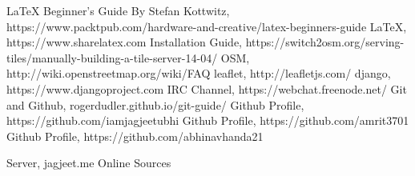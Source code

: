 
\begin{thebibliography}{9}
\bibitem{} \LaTeX{} Beginner's Guide By Stefan Kottwitz, https://www.packtpub.com/hardware-and-creative/latex-beginners-guide 
\bibitem{} \LaTeX{}, https://www.sharelatex.com
\bibitem{} Installation Guide, https://switch2osm.org/serving-tiles/manually-building-a-tile-server-14-04/
\bibitem{} OSM, http://wiki.openstreetmap.org/wiki/FAQ
\bibitem{} leaflet, http://leafletjs.com/
\bibitem{} django, https://www.djangoproject.com
\bibitem{} IRC Channel, https://webchat.freenode.net/
\bibitem{} Git and Github, rogerdudler.github.io/git-guide/
\bibitem{} Github Profile, https://github.com/iamjagjeetubhi
\bibitem{} Github Profile, https://github.com/amrit3701
\bibitem{} Github Profile, https://github.com/abhinavhanda21

\bibitem{} Server, jagjeet.me
\bibitem{} Online Sources
\end{thebibliography}